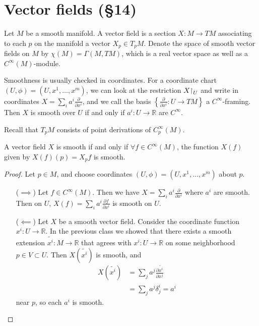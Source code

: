 \section{Vector fields (\S 14)}

Let $M$ be a smooth manifold. A vector field is a section
$X: M \to TM$ associating to each $p$ on the manifold a vector
$X_p \in T_p M$. Denote the space of smooth vector fields on $M$
by $\chi(M) = \Gamma(M, TM)$, which is a real vector space as well as
a $C^\infty(M)$-module.

Smoothness is usually checked in coordinates. For a coordinate chart
$(U, \phi) = (U, x^1, \dots, x^m)$, we can look at the restriction
$X \mathord{\upharpoonright}_U$ and write in coordinates
$X = \sum_i a^i \frac{\partial}{\partial x^i}$, and we call the basis
$\left\{\frac{\partial}{\partial x^i}: U \to TM\right\}$ a
$C^\infty$-framing. Then $X$ is smooth over $U$ if and only if
$a^i : U \to \mathbb{R}$ are $C^\infty$.

Recall that $T_p M$ consists of point derivations of $C_p^\infty(M)$.
\begin{lemma}
A vector field $X$ is smooth if and only if $\forall f \in
C^\infty(M)$, the function $X(f)$ given by $X(f)(p) = X_pf$ is smooth.
\end{lemma}
\begin{proof}
  Let $p \in M$, and choose coordinates
  $(U, \phi) = (U, x^1, \dots, x^m)$ about $p$.
  \begin{itemize}
    \item[($\implies$)]{
      Let $f \in C^\infty(M)$. Then we have
      $X = \sum_i a^i \frac{\partial}{\partial x^i}$ where $a^i$ are
      smooth. Then on $U$,
      $X(f) = \sum_i a^i \frac{\partial f}{\partial x^i}$ is smooth on
      $U$.
    }
    \item[($\impliedby$)]{
      Let $X$ be a smooth vector field. Consider the coordinate
      function $x^i : U \to \mathbb{R}$. In the previous class we
      showed that there exists a smooth extension
      $\tilde{x^i} : M \to \mathbb{R}$ that agrees with
      $x^i : U \to \mathbb{R}$ on some neighborhood $p \in V \subset
      U$. Then $X(\tilde{x^i})$ is smooth, and
      \begin{align*}
         X(\tilde{x^i})
      &= \sum_j a^j \frac{\partial \tilde{x^i}}{\partial x^j} \\
      &= \sum_j a^j \delta^i_j = a^i
      \end{align*}
      near $p$, so each $a^i$ is smooth.
    }
  \end{itemize}
\end{proof}

